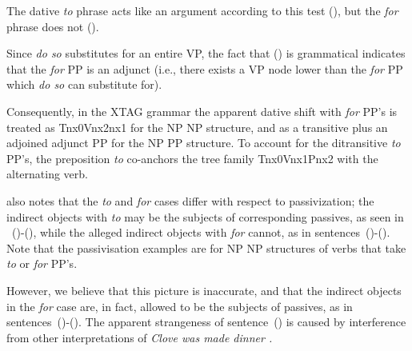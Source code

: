 
\noindent The dative {\it to} phrase acts like an argument according to this
test (), but the {\it for} phrase does not ().



Since {\it do so} substitutes for an entire VP, the fact that () is
grammatical indicates that the {\it for} PP is an adjunct (i.e., there exists a
VP node lower than the {\it for} PP which {\it do so} can substitute for). 

Consequently, in the XTAG grammar the apparent dative shift with {\it
for} PP's is treated as Tnx0Vnx2nx1 for the NP NP structure, and as a
transitive plus an adjoined adjunct PP for the NP PP structure.  To
account for the ditransitive {\it to} PP's, the preposition {\it to}
co-anchors the tree family Tnx0Vnx1Pnx2 with the alternating
verb. 

\cite{mccawley88} also notes that the {\it to} and {\it for} cases
differ with respect to passivization; the indirect objects with {\it to} may be
the subjects of corresponding passives, as seen in ~()-(), while
the alleged indirect objects with {\it for} cannot, as in
sentences~()-().  Note that the passivisation examples are for NP
NP structures of verbs that take {\it to} or {\it for} PP's.


However, we believe that this picture is inaccurate, and that the indirect
objects in the {\it for} case are, in fact, allowed to be the subjects of
passives, as in sentences~()-().  The apparent strangeness of
sentence~() is caused by interference from other interpretations of {\it
Clove was made dinner .}







